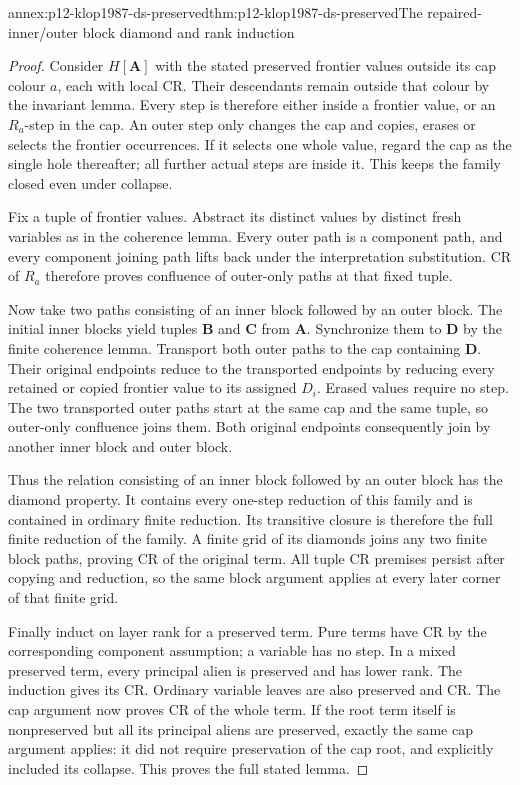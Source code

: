 \begin{annexitem}{annex:p12-klop1987-ds-preserved}{thm:p12-klop1987-ds-preserved}{The repaired-inner/outer block diamond and rank induction}
\begin{proof}
Consider \(H[\mathbf A]\) with the stated preserved frontier values
outside its cap colour \(a\), each with local CR. Their descendants
remain outside that colour by the invariant lemma. Every step is
therefore either inside a frontier value, or an \(R_a\)-step in
the cap. An outer step only changes the cap and copies, erases or
selects the frontier occurrences. If it selects one whole value,
regard the cap as the single hole thereafter; all further actual
steps are inside it. This keeps the family closed even under collapse.

Fix a tuple of frontier values. Abstract its distinct values by
distinct fresh variables as in the coherence lemma. Every outer
path is a component path, and every component joining path lifts
back under the interpretation substitution. CR of \(R_a\)
therefore proves confluence of outer-only paths at that fixed tuple.

Now take two paths consisting of an inner block followed by an
outer block. The initial inner blocks yield tuples \(\mathbf B\)
and \(\mathbf C\) from \(\mathbf A\). Synchronize them to
\(\mathbf D\) by the finite coherence lemma. Transport both
outer paths to the cap containing \(\mathbf D\).
Their original endpoints reduce to the transported endpoints by
reducing every retained or copied frontier value to its assigned
\(D_i\). Erased values require no step. The two transported
outer paths start at the same cap and the same tuple, so outer-only
confluence joins them. Both original endpoints consequently join
by another inner block and outer block.

Thus the relation consisting of an inner block followed by an
outer block has the diamond property. It contains every one-step
reduction of this family and is contained in ordinary finite
reduction. Its transitive closure is therefore the full finite
reduction of the family. A finite grid of its diamonds joins any
two finite block paths, proving CR of the original term. All tuple
CR premises persist after copying and reduction, so the same block
argument applies at every later corner of that finite grid.

Finally induct on layer rank for a preserved term. Pure terms have
CR by the corresponding component assumption; a variable has no
step. In a mixed preserved term, every principal alien is preserved
and has lower rank. The induction gives its CR. Ordinary variable
leaves are also preserved and CR. The cap argument now proves CR
of the whole term. If the root term itself is nonpreserved but all
its principal aliens are preserved, exactly the same cap argument
applies: it did not require preservation of the cap root, and
explicitly included its collapse. This proves the full stated lemma.
\end{proof}
\end{annexitem}


